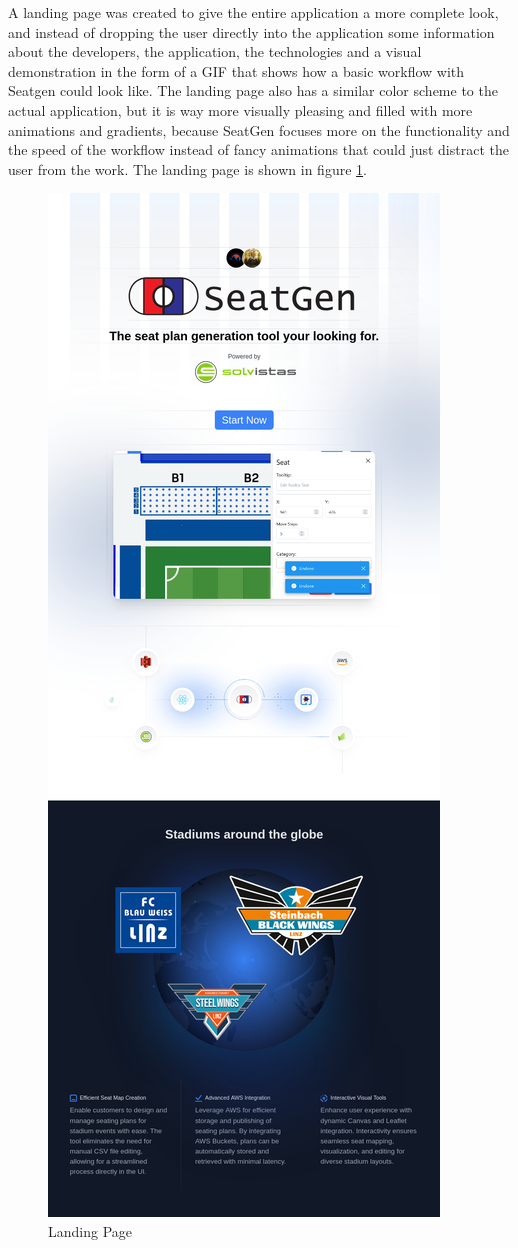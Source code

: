 A landing page was created to give the entire application a more complete look, and instead of dropping the user directly into the application some information about the developers, the application, the technologies and a visual demonstration in the form of a GIF that shows how a basic workflow with Seatgen could look like. The landing page also has a similar color scheme to the actual application, but it is way more visually pleasing and filled with more animations and gradients, because SeatGen focuses more on the functionality and the speed of the workflow instead of fancy animations that could just distract the user from the work. The landing page is shown in figure \ref{fig:landing-page}.

\begin{figure}[H]
    \centering
    \includegraphics[scale=0.3]{pics/landing-page.png}
    \caption{Landing Page}
    \label{fig:landing-page}
\end{figure}
\newpage
